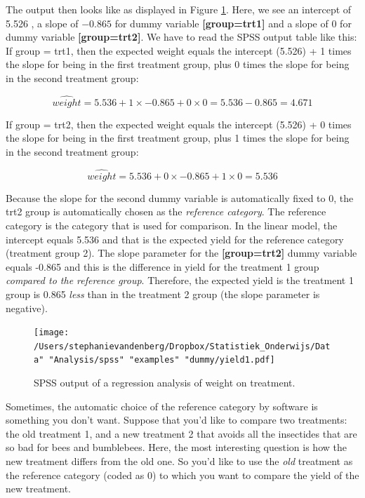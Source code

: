 \documentclass[]{book}\usepackage[]{graphicx}\usepackage[]{color}
\begin{document}
The output then looks like as displayed in Figure \ref{fig:dummy_10}. Here, we see an intercept of 5.526 , a slope of $-0.865$ for dummy variable \textbf{[group=trt1]} and a slope of 0 for dummy variable \textbf{[group=trt2]}. We have to read the SPSS output table like this: If group = trt1, then the expected weight equals the intercept (5.526) + 1 times the slope for being in the first treatment group, plus 0 times the slope for being in the second treatment group:

\begin{equation}
\widehat{weight}= 5.536 + 1 \times -0.865 + 0 \times 0  = 5.536 - 0.865 = 4.671
\end{equation}

If group = trt2, then the expected weight equals the intercept (5.526) + 0 times the slope for being in the first treatment group, plus 1 times the slope for being in the second treatment group:

\begin{equation}
\widehat{weight}= 5.536 + 0 \times -0.865 + 1 \times 0  = 5.536 
\end{equation}

Because the slope for the second dummy variable is automatically fixed to 0, the trt2 group is automatically chosen as the \textit{reference category}. The reference category is the category that is used for comparison. In the linear model, the intercept equals 5.536 and that is the expected yield for the reference category (treatment group 2). The slope parameter for the \textbf{[group=trt2]} dummy variable equals -0.865 and this is the difference in yield for the treatment 1 group \textit{compared to the reference group}. Therefore, the expected yield is the treatment 1 group is 0.865 \textit{less} than in the treatment 2 group (the slope parameter is negative). 

\begin{figure}[h]
    \begin{center}
       \texttt{[image: /Users/stephanievandenberg/Dropbox/Statistiek\_Onderwijs/Data" "Analysis/spss" "examples" "dummy/yield1.pdf]}
    \end{center}
 \caption{SPSS output of a regression analysis of weight on treatment.}
 \label{fig:dummy_10}
\end{figure}

Sometimes, the automatic choice of the reference category by software is something you don't want. Suppose that you'd like to compare two treatments: the old treatment 1, and a new treatment 2 that avoids all the insectides that are so bad for bees and bumblebees. Here, the most interesting question is how the new treatment differs from the old one. So you'd like to use the \textit{old} treatment as the reference category (coded as 0) to which you want to compare the yield of the new treatment.
\end{document}
